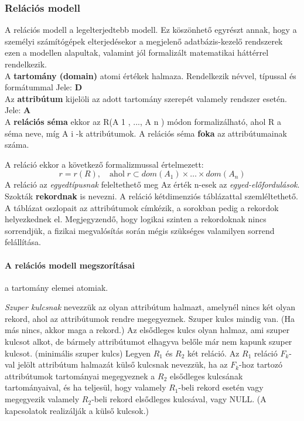 \subsubsection{Relációs modell}
A relációs modell a legelterjedtebb modell. Ez köszönhető egyrészt annak, hogy a
személyi számítógépek elterjedésekor a megjelenő adatbázis-kezelő rendszerek ezen a modellen alapultak, valamint jól formalizált matematikai háttérrel rendelkezik.\\
A \textbf{tartomány (domain)} atomi értékek halmaza. Rendelkezik névvel, típussal és formátummal Jele: \textbf{D}\\
Az \textbf{attribútum} kijelöli az adott tartomány szerepét valamely rendszer esetén. Jele: \textbf{A}\\
A \textbf{relációs séma} ekkor az R(A 1 , ..., A n ) módon formalizálható, ahol R a séma neve, míg A i -k attribútumok. A relációs séma \textbf{foka} az attribútumainak száma.

A reláció ekkor a következő formalizmussal értelmezett:
$$r = r(R),\quad \text{ahol}\; r \subset dom(A_1) \times \dots \times dom(A_n)$$
A reláció az \emph{egyedtípusnak} feleltethető meg Az érték n-esek az \emph{egyed-előfordulások}. Szokták \textbf{rekordnak} is nevezni. A reláció kétdimenziós táblázattal szemléltethető. A táblázat oszlopait az attribútumok címkézik, a sorokban pedig a rekordok helyezkednek el. Megjegyzendő, hogy logikai szinten a rekordoknak nincs sorrendjük, a fizikai megvalósítás során mégis szükséges valamilyen sorrend felállítása.
\paragraph{A relációs modell megszorításai}
\begin{description}[nosep]
	\item[Tartomány megszorítás] a tartomány elemei atomiak.
	\item[Kulcs megszorítás] \emph{Szuper kulcsnak} nevezzük az olyan attribútum halmazt, amelynél nincs két olyan rekord, ahol az attribútumok rendre megegyeznek. Szuper kulcs mindig van. (Ha más nincs, akkor maga a rekord.) Az elsődleges kulcs olyan halmaz, ami szuper kulcsot alkot, de bármely attribútumot elhagyva belőle már nem kapunk szuper kulcsot. (minimális szuper kulcs) Legyen $R_1$ és $R_2$ két reláció. Az $R_1$ reláció $F_k$-val jelölt attribútum halmazát külső kulcsnak nevezzük, ha az $F_k$-hoz tartozó attribútumok tartományai megegyeznek a $R_2$ elsődleges kulcsának tartományaival, és ha teljesül, hogy valamely $R_1$-beli rekord esetén vagy megegyezik valamely $R_2$-beli rekord elsődleges kulcsával, vagy NULL. (A kapcsolatok realizálják a külső kulcsok.)
\end{description}

